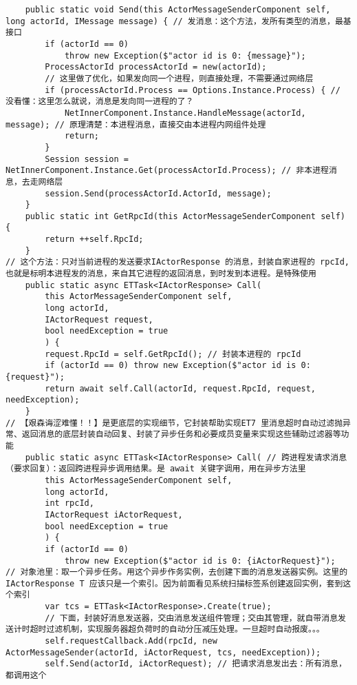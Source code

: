 \documentclass[9pt, b5paper]{article}
\begin{document}
\begin{verbatim}
    public static void Send(this ActorMessageSenderComponent self, long actorId, IMessage message) { // 发消息：这个方法，发所有类型的消息，最基接口
        if (actorId == 0) 
            throw new Exception($"actor id is 0: {message}");
        ProcessActorId processActorId = new(actorId);
        // 这里做了优化，如果发向同一个进程，则直接处理，不需要通过网络层
        if (processActorId.Process == Options.Instance.Process) { // 没看懂：这里怎么就说，消息是发向同一进程的了？
            NetInnerComponent.Instance.HandleMessage(actorId, message); // 原理清楚：本进程消息，直接交由本进程内网组件处理
            return;
        }
        Session session = NetInnerComponent.Instance.Get(processActorId.Process); // 非本进程消息，去走网络层
        session.Send(processActorId.ActorId, message);
    }
    public static int GetRpcId(this ActorMessageSenderComponent self) {
        return ++self.RpcId;
    }
// 这个方法：只对当前进程的发送要求IActorResponse 的消息，封装自家进程的 rpcId, 也就是标明本进程发的消息，来自其它进程的返回消息，到时发到本进程。是特殊使用
    public static async ETTask<IActorResponse> Call(
        this ActorMessageSenderComponent self,
        long actorId,
        IActorRequest request,
        bool needException = true
        ) {
        request.RpcId = self.GetRpcId(); // 封装本进程的 rpcId 
        if (actorId == 0) throw new Exception($"actor id is 0: {request}");
        return await self.Call(actorId, request.RpcId, request, needException);
    }
// 【艰森诲涩难懂！！】是更底层的实现细节，它封装帮助实现ET7 里消息超时自动过滤抛异常、返回消息的底层封装自动回复、封装了异步任务和必要成员变量来实现这些辅助过滤器等功能 
    public static async ETTask<IActorResponse> Call( // 跨进程发请求消息（要求回复）：返回跨进程异步调用结果。是 await 关键字调用，用在异步方法里
        this ActorMessageSenderComponent self,
        long actorId,
        int rpcId,
        IActorRequest iActorRequest,
        bool needException = true
        ) {
        if (actorId == 0) 
            throw new Exception($"actor id is 0: {iActorRequest}");
// 对象池里：取一个异步任务。用这个异步作务实例，去创建下面的消息发送器实例。这里的 IActorResponse T 应该只是一个索引。因为前面看见系统扫描标签系创建返回实例，套到这个索引
        var tcs = ETTask<IActorResponse>.Create(true);
        // 下面，封装好消息发送器，交由消息发送组件管理；交由其管理，就自带消息发送计时超时过滤机制，实现服务器超负荷时的自动分压减压处理。一旦超时自动报废。。。
        self.requestCallback.Add(rpcId, new ActorMessageSender(actorId, iActorRequest, tcs, needException)); 
        self.Send(actorId, iActorRequest); // 把请求消息发出去：所有消息，都调用这个 

\end{verbatim}
\end{document}
